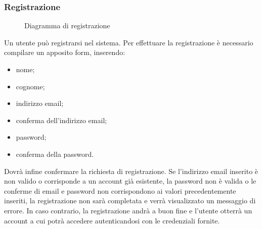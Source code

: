 \documentclass[a4paper, titlepage]{article}
\begin{document}
\newpage
\subsubsection{Registrazione}
\begin{figure}[H]
	\centering
	\noindent{}
	\caption{Diagramma di registrazione}
\end{figure}
Un utente può registrarsi nel sistema. Per effettuare la registrazione è necessario compilare un apposito form, inserendo:
\begin{itemize}
	\item nome;
	\item cognome;
	\item indirizzo email;
	\item conferma dell'indirizzo email;
	\item password;
	\item conferma della password.
\end{itemize}
Dovrà infine confermare la richiesta di registrazione. 
Se l’indirizzo email inserito è non valido o corrisponde a un account già esistente, la password non è valida o le conferme di email e password non corrispondono ai valori precedentemente inseriti, la registrazione non sarà completata e verrà visualizzato un messaggio di errore. 
In caso contrario, la registrazione andrà a buon fine e l’utente otterrà un account a cui potrà accedere autenticandosi con le credenziali fornite. 
\end{document}
